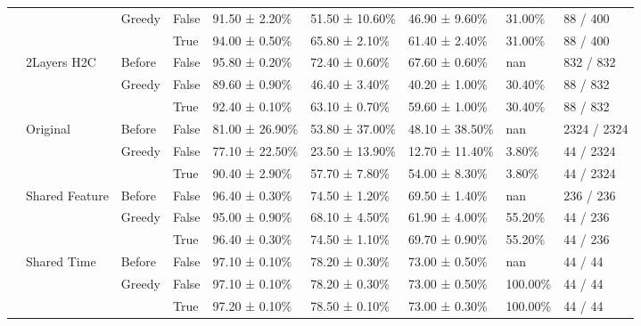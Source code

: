 \begin{tabular}{lllllllll}
\cline{3-9}
 &  & \multirow[t]{2}{*}{Greedy} & False & 91.50 ± 2.20\% & 51.50 ± 10.60\% & 46.90 ± 9.60\% & 31.00\% & 88 / 400 \\
 &  &  & True & 94.00 ± 0.50\% & 65.80 ± 2.10\% & 61.40 ± 2.40\% & 31.00\% & 88 / 400 \\
\cline{2-9} \cline{3-9}
 & \multirow[t]{3}{*}{2Layers H2C} & Before & False & 95.80 ± 0.20\% & 72.40 ± 0.60\% & 67.60 ± 0.60\% & nan & 832 / 832 \\
\cline{3-9}
 &  & \multirow[t]{2}{*}{Greedy} & False & 89.60 ± 0.90\% & 46.40 ± 3.40\% & 40.20 ± 1.00\% & 30.40\% & 88 / 832 \\
 &  &  & True & 92.40 ± 0.10\% & 63.10 ± 0.70\% & 59.60 ± 1.00\% & 30.40\% & 88 / 832 \\
\cline{2-9} \cline{3-9}
 & \multirow[t]{3}{*}{Original} & Before & False & 81.00 ± 26.90\% & 53.80 ± 37.00\% & 48.10 ± 38.50\% & nan & 2324 / 2324 \\
\cline{3-9}
 &  & \multirow[t]{2}{*}{Greedy} & False & 77.10 ± 22.50\% & 23.50 ± 13.90\% & 12.70 ± 11.40\% & 3.80\% & 44 / 2324 \\
 &  &  & True & 90.40 ± 2.90\% & 57.70 ± 7.80\% & 54.00 ± 8.30\% & 3.80\% & 44 / 2324 \\
\cline{2-9} \cline{3-9}
 & \multirow[t]{3}{*}{Shared Feature} & Before & False & 96.40 ± 0.30\% & 74.50 ± 1.20\% & 69.50 ± 1.40\% & nan & 236 / 236 \\
\cline{3-9}
 &  & \multirow[t]{2}{*}{Greedy} & False & 95.00 ± 0.90\% & 68.10 ± 4.50\% & 61.90 ± 4.00\% & 55.20\% & 44 / 236 \\
 &  &  & True & 96.40 ± 0.30\% & 74.50 ± 1.10\% & 69.70 ± 0.90\% & 55.20\% & 44 / 236 \\
\cline{2-9} \cline{3-9}
 & \multirow[t]{3}{*}{Shared Time} & Before & False & 97.10 ± 0.10\% & 78.20 ± 0.30\% & 73.00 ± 0.50\% & nan & 44 / 44 \\
\cline{3-9}
 &  & \multirow[t]{2}{*}{Greedy} & False & 97.10 ± 0.10\% & 78.20 ± 0.30\% & 73.00 ± 0.50\% & 100.00\% & 44 / 44 \\
 &  &  & True & 97.20 ± 0.10\% & 78.50 ± 0.10\% & 73.00 ± 0.30\% & 100.00\% & 44 / 44 \\
\cline{1-9} \cline{2-9} \cline{3-9}
\bottomrule
\end{tabular}
